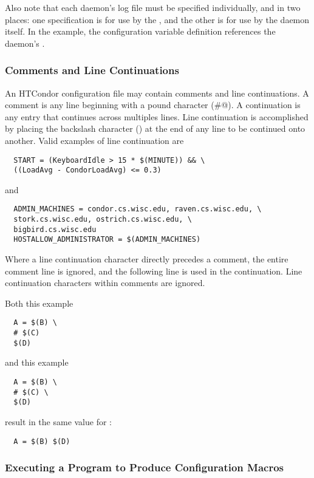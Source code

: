 Also note that each daemon's log file must be specified individually,
and in two places: one specification is for use by the ,
and the other is for use by the daemon itself.
In the example,
the   configuration variable
 definition references the
 daemon's .


\subsubsection{\label{sec:Other-Syntax}Comments and Line Continuations}

An HTCondor configuration file may contain comments and
line continuations.
A comment is any line beginning with a pound character (\verb@#@).
A continuation is any entry that continues across multiples lines.
Line continuation is accomplished by placing the backslash
character (\Bs) at the end of any line to be continued onto another.
Valid examples of line continuation are
\begin{verbatim}
  START = (KeyboardIdle > 15 * $(MINUTE)) && \
  ((LoadAvg - CondorLoadAvg) <= 0.3)
\end{verbatim}
and
\begin{verbatim}
  ADMIN_MACHINES = condor.cs.wisc.edu, raven.cs.wisc.edu, \
  stork.cs.wisc.edu, ostrich.cs.wisc.edu, \
  bigbird.cs.wisc.edu
  HOSTALLOW_ADMINISTRATOR = $(ADMIN_MACHINES)
\end{verbatim}

Where a line continuation character directly precedes a comment,
the entire comment line is ignored,
and the following line is used in the continuation. 
Line continuation characters within comments are ignored.

Both this example
\begin{verbatim}
  A = $(B) \
  # $(C)
  $(D)
\end{verbatim}
and this example
\begin{verbatim}
  A = $(B) \
  # $(C) \
  $(D)
\end{verbatim}
result in the same value for \verb@A@:
\begin{verbatim}
  A = $(B) $(D)
\end{verbatim}

\subsubsection{\label{sec:Program-Defined-Macros}Executing a Program to Produce Configuration Macros}

